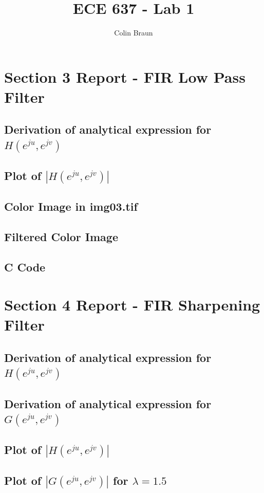\documentclass{article}
\title{ECE 637 - Lab 1}
\author{Colin Braun}
\begin{document}
\maketitle

\section{Section 3 Report - FIR Low Pass Filter}
\subsection{Derivation of analytical expression for $H(e^{ju}, e^{jv})$}
\subsection{Plot of $|H(e^{ju}, e^{jv})|$}
\subsection{Color Image in img03.tif}
\subsection{Filtered Color Image}
\subsection{C Code}

\section{Section 4 Report - FIR Sharpening Filter}
\subsection{Derivation of analytical expression for $H(e^{ju}, e^{jv})$}
\subsection{Derivation of analytical expression for $G(e^{ju}, e^{jv})$}
\subsection{Plot of $|H(e^{ju}, e^{jv})|$}
\subsection{Plot of $|G(e^{ju}, e^{jv})|$ for $\lambda = 1.5$}
\end{document}
